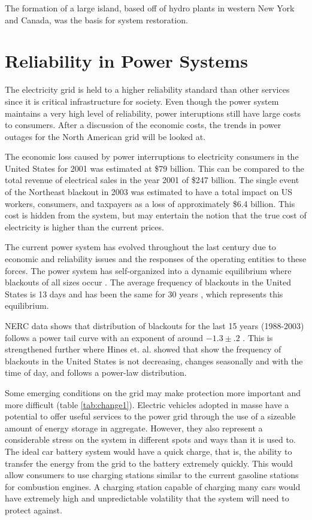 The formation of a large island, based off of hydro plants in western New York and Canada, was the basis for system restoration.
 

\section{Reliability in Power Systems}
The electricity grid is held to a higher reliability standard than other services since it is critical infrastructure for society.  Even though the power system maintains a very high level of reliability, power interuptions still have large costs to consumers.  After a discussion of the economic costs, the trends in power outages for the North American grid will be looked at.

The economic loss caused by power interruptions to electricity consumers in the United States for 2001 was estimated at \$79 billion.\cite{lacommare_2006}  This can be compared to the total revenue of electrical sales in the year 2001 of \$247 billion.\cite{eia_sales}  The single event of the Northeast blackout in 2003 was estimated to have a total impact on US workers, consumers, and taxpayers as a loss of approximately \$6.4 billion.\cite{anderson_2003}  This cost is hidden from the system, but may entertain the notion that the true cost of electricity is higher than the current prices.  

The current power system has evolved throughout the last century due to economic and reliability issues and the responses of the operating entities to these forces.  The power system has self-organized into a dynamic equilibrium where blackouts of all sizes occur \cite{dobson_2001}.  The average frequency of blackouts in the United States is 13 days and has been the same for 30 years \cite{carreras_2004}, which represents this equilibrium.  
	
NERC data shows that distribution of blackouts for the last 15 years (1988-2003) follows a power tail curve with an exponent of around $-1.3\pm.2$ \cite{carreras_2004}. This is strengthened further where Hines et. al. showed that show the frequency of blackouts in the United States is not decreasing, changes seasonally and with the time of day, and follows a power-law distribution.\cite{hines_2008} \cite{hines_2009}

Some emerging conditions on the grid may make protection more important and more difficult (table \ref{tab:change1}).  Electric vehicles adopted in masse have a potential to offer useful services to the power grid through the use of a sizeable amount of energy storage in aggregate.  However, they also represent a considerable stress on the system in different spots and ways than it is used to.  The ideal car battery system would have a quick charge, that is, the ability to transfer the energy from the grid to the battery extremely quickly.  This would allow consumers to use charging stations similar to the current gasoline stations for combustion engines.  A charging station capable of charging many cars would have extremely high and unpredictable volatility that the system will need to protect against.

